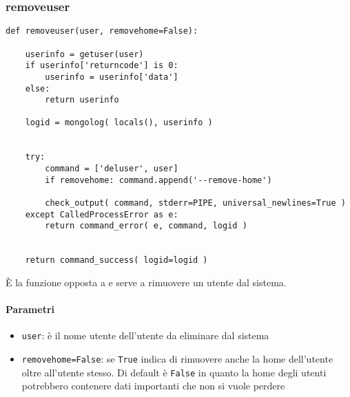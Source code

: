 \documentclass[11pt]{article}
\begin{document}
\subsubsection{removeuser}\label{removeuser}
\begin{lstlisting}
def removeuser(user, removehome=False):
	
    userinfo = getuser(user)
    if userinfo['returncode'] is 0:
        userinfo = userinfo['data']
    else:
        return userinfo

    logid = mongolog( locals(), userinfo )
    

    try:
        command = ['deluser', user]
        if removehome: command.append('--remove-home') 

        check_output( command, stderr=PIPE, universal_newlines=True )
    except CalledProcessError as e:
        return command_error( e, command, logid )
    
    
    return command_success( logid=logid )
\end{lstlisting}
È la funzione opposta a  e serve a rimuovere un utente dal sistema.
\paragraph{Parametri}
\begin{itemize}
	\item{\texttt{user}: è il nome utente dell'utente da eliminare dal sistema}
	\item{\texttt{removehome=False}: se \texttt{True} indica di rimuovere anche la home dell'utente oltre
		all'utente stesso. Di default è \texttt{False} in quanto la home degli utenti potrebbero contenere
		dati importanti che non si vuole perdere}
\end{itemize}
\end{document}
